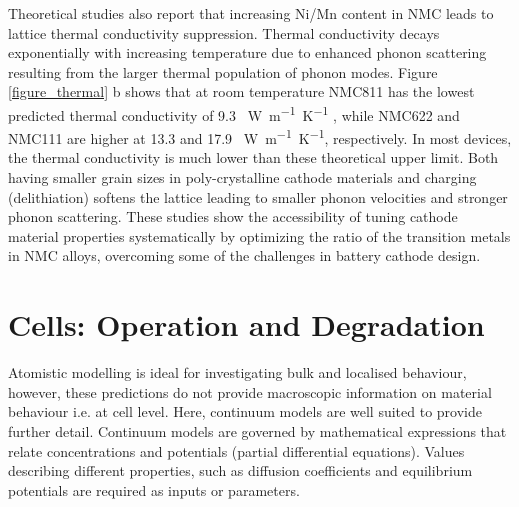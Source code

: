 \documentclass[journal=jacsat,manuscript=article]{achemso}
\begin{document}
Theoretical studies also report that increasing Ni/Mn content in NMC leads to lattice thermal conductivity suppression.\cite{yang2020chemical} Thermal conductivity decays exponentially with increasing temperature due to enhanced phonon scattering resulting from the larger thermal population of phonon modes. Figure \ref{figure_thermal} b shows that at room temperature NMC811 has the lowest predicted thermal conductivity of 9.3 \SI{}{W.m^{-1}.K^{-1}} , while NMC622 and NMC111 are higher at 13.3 and 17.9 \SI{}{W.m^{-1}.K^{-1}}, respectively. In most devices, the thermal conductivity is much lower than these theoretical upper limit.\cite{takahata2002thermal,chen2006thermal} Both having smaller grain sizes in poly-crystalline cathode materials and charging (delithiation) softens the lattice leading to smaller phonon velocities and stronger phonon scattering. \cite{feng2020quantum,xia2020high} These studies show the accessibility of tuning cathode material properties systematically by optimizing the ratio of the transition metals in NMC alloys, overcoming some of the challenges in battery cathode design.


\clearpage

\section{Cells: Operation and Degradation}
Atomistic modelling is ideal for investigating bulk and localised behaviour, however, these predictions do not provide macroscopic information on material behaviour i.e. at cell level. Here, continuum models are well suited to provide further detail. Continuum models are governed by mathematical expressions that relate concentrations and potentials (partial differential equations). Values describing different properties, such as diffusion coefficients and equilibrium potentials are required as inputs or parameters.
\end{document}
